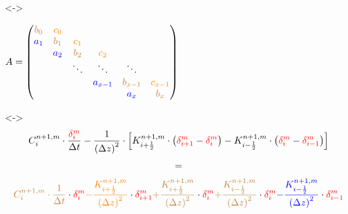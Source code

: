 \documentclass[xcolor=dvipsnames]{beamer}
\newcounter{thirdElement}
\begin{document}
\begin{frame}[t]
  \only<\thethirdElement->{
    \centerline{
      \begin{math}
        A =
        \begin{pmatrix}
          \textcolor{brown}{b_0} & \textcolor{orange}{c_0} & & & & \\
          \textcolor{blue}{a_1} & \textcolor{brown}{b_1} & \textcolor{orange}{c_1} & & & \\
          & \textcolor{blue}{a_2} & \textcolor{brown}{b_2} & \textcolor{orange}{c_2} & & \\
          & & \ddots & \ddots & \ddots & \\
          & & & \textcolor{blue}{a_{x-1}} & \textcolor{brown}{b_{x-1}} & \textcolor{orange}{c_{x-1}} \\
          & & & & \textcolor{blue}{a_x} & \textcolor{brown}{b_x}
        \end{pmatrix}
      \end{math}}}
  \only<\thethirdElement->{
    \begin{gather*}
      C_i^{n+1,m} \cdot \frac{\textcolor{red}{\delta_i^m}}{\Delta t} - \frac{1}{\left(\Delta z\right)^2} \cdot \left[K_{i+\frac{1}{2}}^{n+1,m} \cdot \left(\textcolor{red}{\delta_{i+1}^m} - \textcolor{red}{\delta_i^m}\right) - K_{i-\frac{1}{2}}^{n+1,m} \cdot \left(\textcolor{red}{\delta_i^m} - \textcolor{red}{\delta_{i-1}^m}\right)\right] \\[+1mm]
      = \\[+1mm]
      \textcolor{brown}{C_i^{n+1,m} \cdot \frac{1}{\Delta t}} \cdot \textcolor{red}{\delta_i^m}
      \textcolor{orange}{ - \frac{K_{i+\frac{1}{2}}^{n+1,m}}{\left(\Delta z\right)^2}} \cdot \textcolor{red}{\delta_{i+1}^m}
      \textcolor{brown}{ + \frac{K_{i+\frac{1}{2}}^{n+1,m}}{\left(\Delta z\right)^2}} \cdot \textcolor{red}{\delta_i^m}
      \textcolor{brown}{ + \frac{K_{i-\frac{1}{2}}^{n+1,m}}{\left(\Delta z\right)^2}} \cdot \textcolor{red}{\delta_i^m}
      \textcolor{blue}{ - \frac{K_{i-\frac{1}{2}}^{n+1,m}}{\left(\Delta z\right)^2}} \cdot \textcolor{red}{\delta_{i-1}^m}
    \end{gather*}}
\end{frame}
\end{document}
